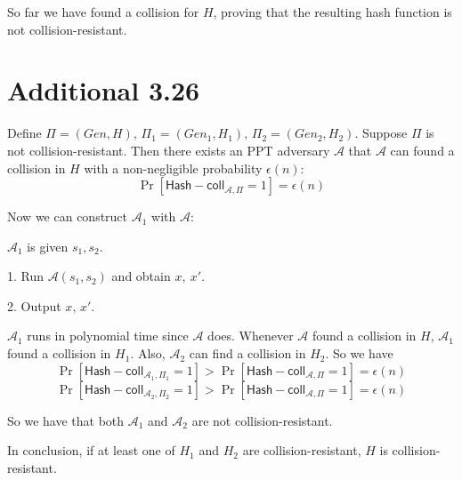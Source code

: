 \documentclass[a4papers]{ctexart}
\newcommand{\mc}[1]{\mathcal{#1}}
\newcommand{\ms}[1]{\mathsf{#1}}
\begin{document}
So far we have found a collision for $H$, proving that the resulting hash function is 
not collision-resistant.


\section*{Additional 3.26}
Define $\Pi=(Gen,H),\,\Pi_1=(Gen_1,H_1),\,\Pi_2=(Gen_2,H_2)$.
Suppose $\Pi$ is not collision-resistant. Then there exists an PPT adversary $\mc{A}$ 
that $\mc{A}$ can found a collision in $H$ with a non-negligible probability $\epsilon(n)$:
\[ \Pr[\ms{Hash-coll}_{\mc{A},\Pi}=1]=\epsilon(n)\]

Now we can construct $\mc{A}_1$ with $\mc{A}$:

$\mc{A}_1$ is given $s_1,s_2$.

1. Run $\mc{A}(s_1,s_2)$ and obtain $x, \ x'$.

2. Output $x,\,x'$.

$\mc{A}_1$ runs in polynomial time since $\mc{A}$ does. 
Whenever $\mc{A}$ found a collision in $H$, $\mc{A}_1$ found a collision in $H_1$. 
Also, $\mc{A}_2$ can find a collision in $H_2$. So we have 
\[ \Pr[\ms{Hash-coll}_{\mc{A}_1,\Pi_1}=1] > \Pr[\ms{Hash-coll}_{\mc{A},\Pi}=1] = \epsilon(n) \]
\[ \Pr[\ms{Hash-coll}_{\mc{A}_2,\Pi_2}=1] > \Pr[\ms{Hash-coll}_{\mc{A},\Pi}=1] = \epsilon(n) \]

So we have that both $\mc{A}_1$ and $\mc{A}_2$ are not collision-resistant.

In conclusion, if at least one of $H_1$ and $H_2$ are collision-resistant, $H$ is collision-resistant.
\end{document}
